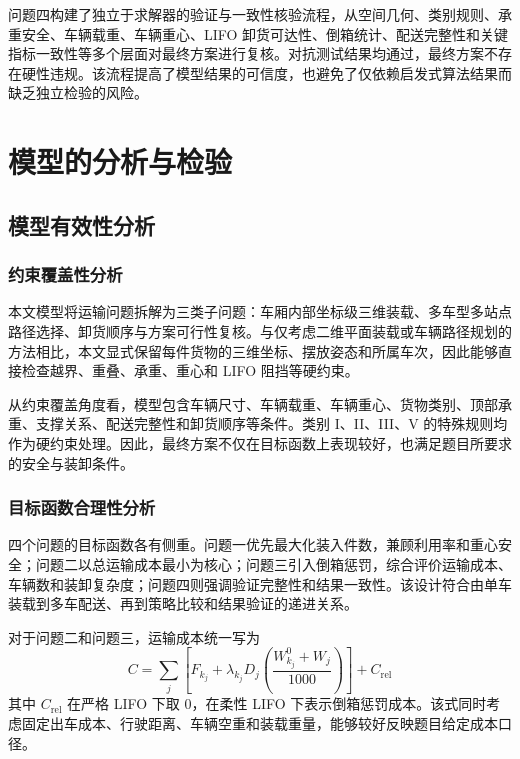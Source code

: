 ﻿\documentclass[UTF8,a4paper,12pt]{ctexart}
\newcommand{\paperbold}{\CJKfontspec[AutoFakeBold=4]{SimSun}\bfseries}
\newcommand{\modelsubpoint}[1]{\vspace{0.35em}\noindent{\paperbold #1}\par\vspace{0.12em}}
\begin{document}
	\modelsubpoint{问题四小结}
	
	问题四构建了独立于求解器的验证与一致性核验流程，从空间几何、类别规则、承重安全、车辆载重、车辆重心、LIFO 卸货可达性、倒箱统计、配送完整性和关键指标一致性等多个层面对最终方案进行复核。对抗测试结果均通过，最终方案不存在硬性违规。该流程提高了模型结果的可信度，也避免了仅依赖启发式算法结果而缺乏独立检验的风险。
	
	\section{模型的分析与检验}
	
	\subsection{模型有效性分析}
	
	\subsubsection{约束覆盖性分析}
	
	本文模型将运输问题拆解为三类子问题：车厢内部坐标级三维装载、多车型多站点路径选择、卸货顺序与方案可行性复核。与仅考虑二维平面装载或车辆路径规划的方法相比，本文显式保留每件货物的三维坐标、摆放姿态和所属车次，因此能够直接检查越界、重叠、承重、重心和 LIFO 阻挡等硬约束。
	
	从约束覆盖角度看，模型包含车辆尺寸、车辆载重、车辆重心、货物类别、顶部承重、支撑关系、配送完整性和卸货顺序等条件。类别 I、II、III、V 的特殊规则均作为硬约束处理。因此，最终方案不仅在目标函数上表现较好，也满足题目所要求的安全与装卸条件。
	
	\subsubsection{目标函数合理性分析}
	
	四个问题的目标函数各有侧重。问题一优先最大化装入件数，兼顾利用率和重心安全；问题二以总运输成本最小为核心；问题三引入倒箱惩罚，综合评价运输成本、车辆数和装卸复杂度；问题四则强调验证完整性和结果一致性。该设计符合由单车装载到多车配送、再到策略比较和结果验证的递进关系。
	
	对于问题二和问题三，运输成本统一写为
	\begin{equation}
		C=\sum_{j} \left[F_{k_j}+\lambda_{k_j}D_j
		\left(\frac{W^0_{k_j}+W_j}{1000}\right)\right]+C_{\mathrm{rel}}
	\end{equation}
	其中 $C_{\mathrm{rel}}$ 在严格 LIFO 下取 0，在柔性 LIFO 下表示倒箱惩罚成本。该式同时考虑固定出车成本、行驶距离、车辆空重和装载重量，能够较好反映题目给定成本口径。
	
\end{document}
